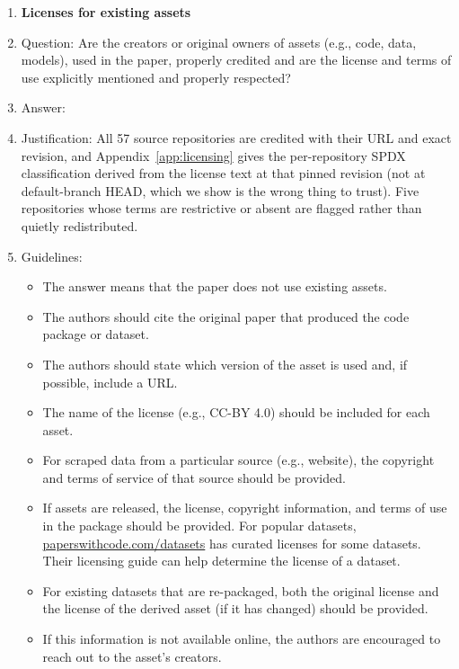 \begin{enumerate}
\item {\bf Licenses for existing assets}
    \item[] Question: Are the creators or original owners of assets (e.g., code, data, models), used in the paper, properly credited and are the license and terms of use explicitly mentioned and properly respected?
    \item[] Answer: \answerYes{}
    \item[] Justification: All 57 source repositories are credited with their URL and exact revision, and Appendix~\ref{app:licensing} gives the per-repository SPDX classification derived from the license text at that pinned revision (not at default-branch HEAD, which we show is the wrong thing to trust). Five repositories whose terms are restrictive or absent are flagged rather than quietly redistributed. 
    \item[] Guidelines:
    \begin{itemize}
        \item The answer \answerNA{} means that the paper does not use existing assets.
        \item The authors should cite the original paper that produced the code package or dataset.
        \item The authors should state which version of the asset is used and, if possible, include a URL.
        \item The name of the license (e.g., CC-BY 4.0) should be included for each asset.
        \item For scraped data from a particular source (e.g., website), the copyright and terms of service of that source should be provided.
        \item If assets are released, the license, copyright information, and terms of use in the package should be provided. For popular datasets, \url{paperswithcode.com/datasets} has curated licenses for some datasets. Their licensing guide can help determine the license of a dataset.
        \item For existing datasets that are re-packaged, both the original license and the license of the derived asset (if it has changed) should be provided.
        \item If this information is not available online, the authors are encouraged to reach out to the asset's creators.
    \end{itemize}


\end{enumerate}
